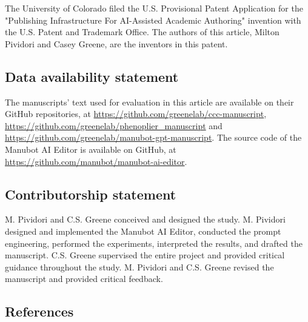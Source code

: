 \documentclass[
]{article}
\begin{document}
The University of Colorado filed the U.S. Provisional Patent Application for the "Publishing Infrastructure For AI-Assisted Academic Authoring" invention with the U.S. Patent and Trademark Office.
The authors of this article, Milton Pividori and Casey Greene, are the inventors in this patent.

\subsection{Data availability statement}

The manuscripts' text used for evaluation in this article are available on their GitHub repositories, at \url{https://github.com/greenelab/ccc-manuscript}, \url{https://github.com/greenelab/phenoplier_manuscript} and \url{https://github.com/greenelab/manubot-gpt-manuscript}.
The source code of the Manubot AI Editor is available on GitHub, at \url{https://github.com/manubot/manubot-ai-editor}.

\subsection{Contributorship statement}

M. Pividori and C.S. Greene conceived and designed the study.
M. Pividori designed and implemented the Manubot AI Editor, conducted the prompt engineering, performed the experiments, interpreted the results, and drafted the manuscript.
C.S. Greene supervised the entire project and provided critical guidance throughout the study.
M. Pividori and C.S. Greene revised the manuscript and provided critical feedback.

\subsection{References}
\end{document}
